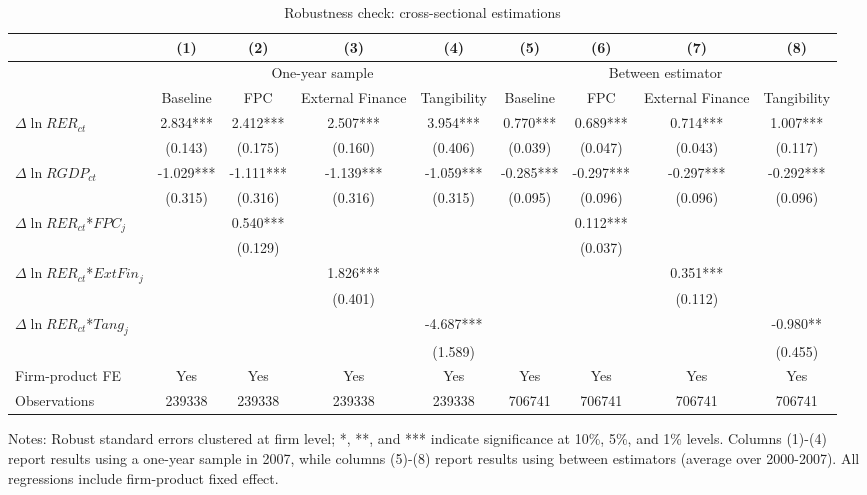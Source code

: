 \documentclass[12pt]{article}
\begin{document}
\begin{table}
	\centering
	\caption{Robustness check: cross-sectional estimations}
	\begin{threeparttable}
		\begin{tabular}{lcccccccc}
			\toprule
			& (1)   & (2)   & (3)   & (4) &  (5)  &  (6)  & (7)  & (8)\\
			\midrule
			& \multicolumn{4}{c}{One-year sample} & \multicolumn{4}{c}{Between estimator}\\
			& Baseline & FPC   & External Finance & Tangibility & Baseline & FPC & External Finance & Tangibility\\
			\midrule
			$\Delta \ln RER_{ct}$ & 2.834*** & 2.412*** & 2.507*** & 3.954*** & 0.770*** & 0.689*** & 0.714*** & 1.007*** \\
			& (0.143) & (0.175) & (0.160) & (0.406) & (0.039) & (0.047) & (0.043) & (0.117) \\
			$\Delta \ln RGDP_{ct}$ &  -1.029*** & -1.111*** & -1.139*** & -1.059*** & -0.285*** & -0.297*** & -0.297*** & -0.292*** \\
			& (0.315) & (0.316) & (0.316) & (0.315) & (0.095) & (0.096) & (0.096) & (0.096) \\
			$\Delta \ln RER_{ct}$*$FPC_{j}$ &   & 0.540*** &       &       &       & 0.112*** &       &  \\
			&   & (0.129) &       &       &       & (0.037) &       &  \\
			$\Delta \ln RER_{ct}$*$ExtFin_{j}$ &     &       & 1.826*** &       &       &       & 0.351*** &  \\
			&  &       & (0.401) &       &       &       & (0.112) &  \\
			$\Delta \ln RER_{ct}$*$Tang_{j}$ &   &       &       & -4.687*** &       &       &       & -0.980** \\
			&   &       &       & (1.589) &       &       &       & (0.455) \\
			Firm-product FE &  Yes   & Yes   & Yes   & Yes &Yes   & Yes   & Yes   & Yes\\
			Observations & 239338 & 239338 & 239338 & 239338 & 706741 & 706741 & 706741 & 706741\\
			\bottomrule
		\end{tabular}
		\begin{tablenotes}
			\footnotesize
			\item[Notes:] Robust standard errors clustered at firm level; *, **, and *** indicate significance at 10\%, 5\%, and 1\% levels. Columns (1)-(4) report results using a one-year sample in 2007, while columns (5)-(8) report results using between estimators (average over 2000-2007). All regressions include firm-product fixed effect.
		\end{tablenotes}
	\end{threeparttable}
	\label{tab.robust.crosec}
\end{table}
\end{document}
